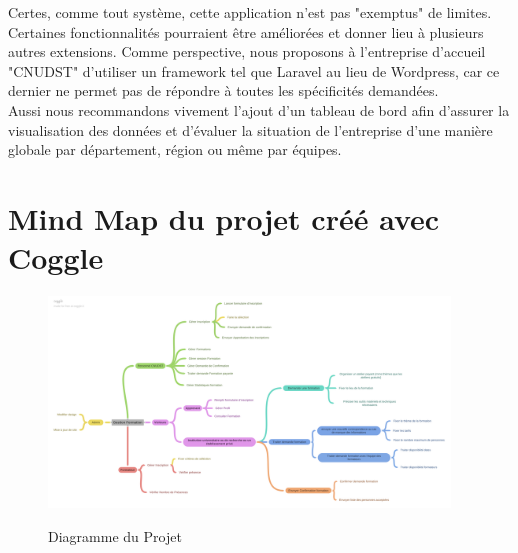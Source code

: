 \documentclass[a4paper, oneside, 12pt, final]{extreport}
\begin{document}
Certes, comme tout système, cette application n'est pas "exemptus" de limites. Certaines fonctionnalités pourraient être améliorées et donner lieu à plusieurs autres extensions.
Comme perspective, nous proposons à l'entreprise d'accueil "CNUDST" d'utiliser un framework tel que Laravel au lieu de Wordpress, car ce dernier ne permet pas de répondre à toutes les spécificités demandées.\\
Aussi nous recommandons vivement l'ajout d'un tableau de bord afin d'assurer la visualisation des données et d'évaluer la situation de l'entreprise d'une manière globale par département, région ou même par équipes.

\newpage
\appendix
{}

\chapter{Mind Map du projet créé avec Coggle}
\label{chap:appendix}



\begin{figure}[!h]
	\centering
	{\includegraphics[width=0.95\textwidth]{D) IMAGES/map.png}}
	\caption{Diagramme du Projet}
	\label{Org}
\end{figure}
\end{document}
